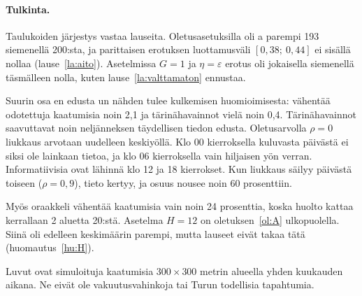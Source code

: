 \paragraph{Tulkinta.}
Taulukoiden järjestys vastaa lauseita. Oletusasetuksilla
 oli a parempi 193 siemenellä 200:sta, ja parittaisen
erotuksen luottamusväli $[0{,}38;\ 0{,}44]$ ei sisällä nollaa
(lause~\ref{la:aito}). Asetelmissa $G = 1$ ja $\eta = \varepsilon$ erotus oli
jokaisella siemenellä täsmälleen nolla, kuten lause~\ref{la:valttamaton}
ennustaa.

Suurin osa en edusta un nähden tulee kulkemisen
huomioimisesta:  vähentää odotettuja kaatumisia noin 2,1 ja
tärinähavainnot vielä noin 0,4. Tärinähavainnot saavuttavat noin neljänneksen
täydellisen tiedon edusta. Oletusarvolla $\rho = 0$ liukkaus arvotaan
uudelleen keskiyöllä. Klo 00 kierroksella kuluvasta päivästä ei siksi ole
lainkaan tietoa, ja klo 06 kierroksella vain hiljaisen yön verran.
Informatiivisia ovat lähinnä klo 12 ja 18 kierrokset. Kun liukkaus säilyy
päivästä toiseen ($\rho = 0{,}9$), tieto kertyy, ja osuus nousee noin
60 prosenttiin.

Myös oraakkeli vähentää kaatumisia vain noin 24 prosenttia, koska huolto
kattaa kerrallaan 2 aluetta 20:stä. Asetelma $H = 12$ on oletuksen~\ref{ol:A}
ulkopuolella. Siinä  oli edelleen keskimäärin parempi, mutta
lauseet eivät takaa tätä (huomautus~\ref{hu:H}).

Luvut ovat simuloituja kaatumisia $300 \times 300$ metrin alueella yhden kuukauden
aikana. Ne eivät ole vakuutusvahinkoja tai Turun todellisia tapahtumia.
